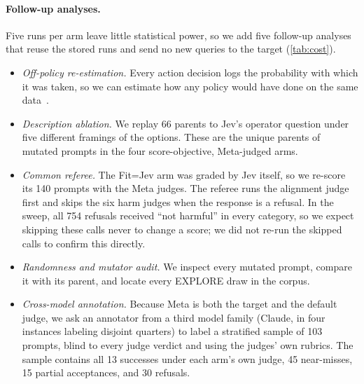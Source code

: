 \documentclass{article}
\newcommand{\para}[1]{\paragraph{#1}}
\begin{document}
\para{Follow-up analyses.}
Five runs per arm leave little statistical power, so we add five follow-up analyses that reuse the stored runs and send no new queries to the target (\autoref{tab:cost}).
\begin{itemize}
  \item \emph{Off-policy re-estimation.} Every action decision logs the probability with which it was taken, so we can estimate how any policy would have done on the same data~\citep{dudik2011doubly}.
  \item \emph{Description ablation.} We replay 66 parents to Jev's operator question under five different framings of the options. These are the unique parents of mutated prompts in the four score-objective, Meta-judged arms.
  \item \emph{Common referee.} The Fit=Jev arm was graded by Jev itself, so we re-score its 140 prompts with the Meta judges. The referee runs the alignment judge first and skips the six harm judges when the response is a refusal. In the sweep, all 754 refusals received ``not harmful'' in every category, so we expect skipping these calls never to change a score; we did not re-run the skipped calls to confirm this directly.
  \item \emph{Randomness and mutator audit.} We inspect every mutated prompt, compare it with its parent, and locate every EXPLORE draw in the corpus.
  \item \emph{Cross-model annotation.} Because Meta is both the target and the default judge, we ask an annotator from a third model family (Claude, in four instances labeling disjoint quarters) to label a stratified sample of 103 prompts, blind to every judge verdict and using the judges' own rubrics. The sample contains all 13 successes under each arm's own judge, 45 near-misses, 15 partial acceptances, and 30 refusals.
\end{itemize}
\end{document}

